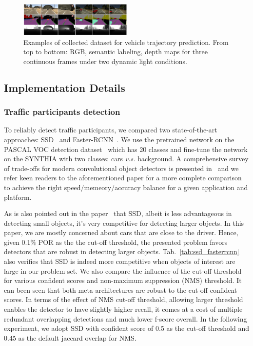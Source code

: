 \documentclass[10pt,twocolumn,letterpaper]{article}
\begin{document}
\begin{figure}[t]
        \centering
        \includegraphics[width=0.5\textwidth]{figures/dataset.pdf}
        \caption{Examples of collected dataset for vehicle trajectory prediction. From top to bottom: RGB, semantic labeling, depth maps for three continuous frames under two dynamic light conditions.}
        \label{fig:dataset}
\end{figure}

\subsection{Implementation Details}\label{sec:Implementations}


\subsubsection{Traffic participants detection}

To reliably detect traffic participants, we compared two state-of-the-art approaches: SSD~\cite{liu2016ssd} and Faster-RCNN~\cite{ren2015faster_nips}.
We use the pretrained network on the PASCAL VOC detection dataset~\cite{everingham2015pascal} which has 20 classes and fine-tune the network on the SYNTHIA with two classes: cars \emph{v.s.} background.
A comprehensive survey of trade-offs for modern convolutional object detectors is presented in~\cite{huang2017speed} and we refer keen readers to the aforementioned paper for a more complete comparison to achieve the right speed/memeory/accuracy balance for a given application and platform.

As is also pointed out in the paper~\cite{huang2017speed} that SSD, albeit is less advantageous in detecting small objects, it's very competitive for detecting larger objects. In this paper, we are mostly concerned about cars that are close to the driver. Hence, given 0.1\% POR as the the cut-off threshold, the presented problem favors detectors that are robust in detecting larger objects.
Tab.~\ref{tab:ssd_fasterrcnn} also verifies that SSD is indeed more competitive when objects of interest are large in our problem set.
We also compare the influence of the cut-off threshold for various confident scores and non-maximum suppression (NMS) threshold. It can been seen that both meta-architectures are robust to the cut-off confident scores.
In terms of the effect of NMS cut-off threshold, allowing larger threshold enables the detector to have slightly higher recall, it comes at a cost of multiple redundant overlapping detections and much lower f-score overall. In the following experiment, we adopt SSD with confident score of 0.5 as the cut-off threshold and 0.45 as the default jaccard overlap for NMS.
\end{document}
